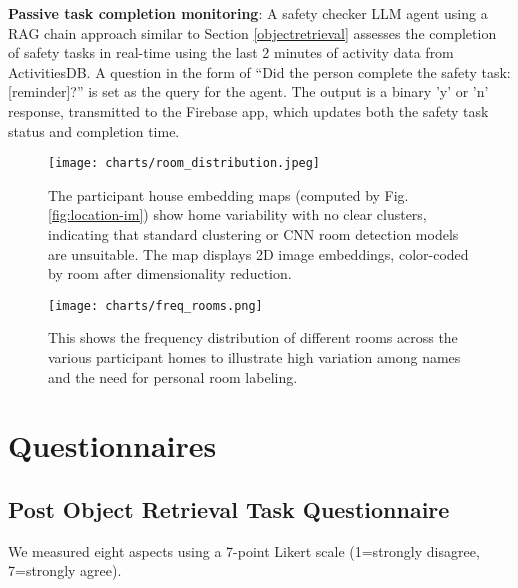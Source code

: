 \textbf{Passive task completion monitoring}: A safety checker LLM agent using a RAG chain approach similar to Section \ref{objectretrieval} assesses the completion of safety tasks in real-time using the last 2 minutes of activity data from ActivitiesDB. A question in the form of “Did the person complete the safety task: [reminder]?” is set as the query for the agent. The output is a binary 'y' or 'n' response, transmitted to the Firebase app, which updates both the safety task status and completion time. 




\begin{figure*}
  \centering
  \texttt{[image: charts/room\_distribution.jpeg]}
  \caption{The participant house embedding maps (computed by Fig. \ref{fig:location-im}) show home variability with no clear clusters, indicating that standard clustering or CNN room detection models are unsuitable. The map displays 2D image embeddings, color-coded by room after dimensionality reduction.}
  
  \label{roomdistribution}
\end{figure*}


\begin{figure*}
    \centering
    \texttt{[image: charts/freq\_rooms.png]}
    \caption{This shows the frequency distribution of different rooms across the various participant homes to illustrate high variation among names and the need for personal room labeling.}
    \label{fig:roomfreq}
\end{figure*}


\section{Questionnaires}
\subsection{Post Object Retrieval Task Questionnaire}
\label{appendixPostObjectRetrieval}

We measured eight aspects using a 7-point Likert scale (1=strongly disagree, 7=strongly agree).

